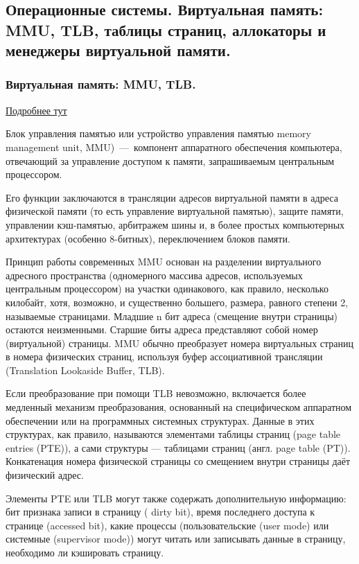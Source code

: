 \subsection{Операционные системы. Виртуальная память: MMU, TLB, таблицы страниц, аллокаторы и менеджеры виртуальной памяти.}

\subsubsection{Виртуальная память: MMU, TLB.}

\href{https://habr.com/ru/post/211150/}{Подробнее тут}

Блок управления памятью или устройство управления памятью memory management unit, MMU)~---~компонент аппаратного обеспечения компьютера, отвечающий за управление доступом к памяти, запрашиваемым центральным процессором.

Его функции заключаются в трансляции адресов виртуальной памяти в адреса физической памяти (то есть управление виртуальной памятью), защите памяти, управлении кэш-памятью, арбитражем шины и, в более простых компьютерных архитектурах (особенно 8-битных), переключением блоков памяти. 

Принцип работы современных MMU основан на разделении виртуального адресного пространства (одномерного массива адресов, используемых центральным процессором) на участки одинакового, как правило, несколько килобайт, хотя, возможно, и существенно большего, размера, равного степени 2, называемые страницами. Младшие n бит адреса (смещение внутри страницы) остаются неизменными. Старшие биты адреса представляют собой номер (виртуальной) страницы. MMU обычно преобразует номера виртуальных страниц в номера физических страниц, используя буфер ассоциативной трансляции (Translation Lookaside Buffer, TLB).

Если преобразование при помощи TLB невозможно, включается более медленный механизм преобразования, основанный на специфическом аппаратном обеспечении или на программных системных структурах. Данные в этих структурах, как правило, называются элементами таблицы страниц (page table entries (PTE)), а сами структуры — таблицами страниц (англ. page table (PT)). Конкатенация номера физической страницы со смещением внутри страницы даёт физический адрес.

Элементы PTE или TLB могут также содержать дополнительную информацию: бит признака записи в страницу ( dirty bit), время последнего доступа к странице (accessed bit), какие процессы (пользовательские (user mode) или системные (supervisor mode)) могут читать или записывать данные в страницу, необходимо ли кэшировать страницу.

